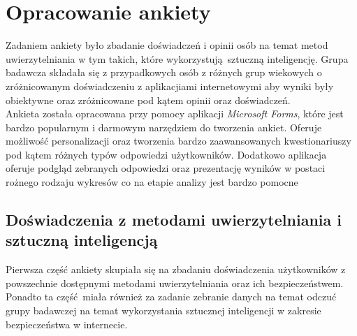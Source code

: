\section{Opracowanie ankiety}
Zadaniem ankiety było zbadanie doświadczeń i opinii osób na temat metod uwierzytelniania w tym takich, które wykorzystują sztuczną inteligencję. Grupa badawcza składała się z przypadkowych osób z różnych grup wiekowych o zróżnicowanym doświadczeniu z aplikacjiami internetowymi aby wyniki były obiektywne oraz zróżnicowane pod kątem opinii oraz doświadczeń. \\
Ankieta została opracowana przy pomocy aplikacji \emph{Microsoft Forms}, które jest bardzo popularnym i darmowym narzędziem do tworzenia ankiet. Oferuje możliwość personalizacji oraz tworzenia bardzo zaawansowanych kwestionariuszy pod kątem różnych typów odpowiedzi użytkowników. Dodatkowo aplikacja oferuje podgląd zebranych odpowiedzi oraz prezentację wyników w postaci rożnego rodzaju wykresów co na etapie analizy jest bardzo pomocne
\subsection{Doświadczenia z metodami uwierzytelniania i sztuczną inteligencją} Pierwsza część ankiety skupiała się na zbadaniu doświadczenia użytkowników z powszechnie dostępnymi metodami uwierzytelniania oraz ich bezpieczeństwem. Ponadto ta część miała również za zadanie zebranie danych na temat odczuć grupy badawczej na temat wykorzystania sztucznej inteligencji w zakresie bezpieczeństwa w internecie.

